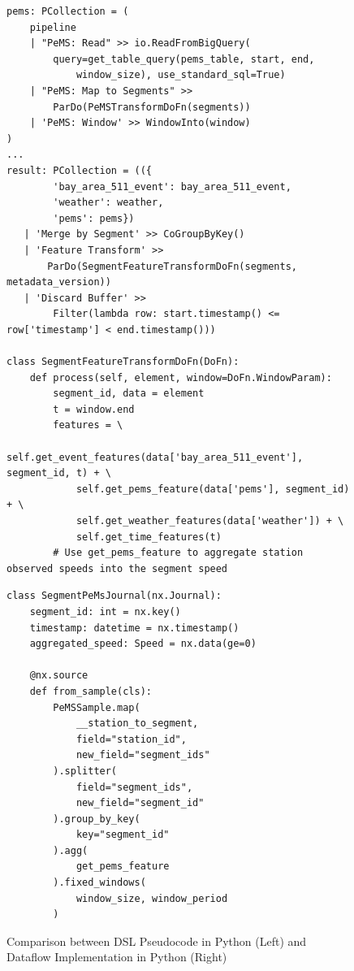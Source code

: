 \begin{figure}
    \centering
  \begin{minipage}[t]{.45\linewidth}
\begin{verbatim}
pems: PCollection = (
    pipeline
    | "PeMS: Read" >> io.ReadFromBigQuery(
        query=get_table_query(pems_table, start, end, 
            window_size), use_standard_sql=True)
    | "PeMS: Map to Segments" >> 
        ParDo(PeMSTransformDoFn(segments))
    | 'PeMS: Window' >> WindowInto(window)
)
...
result: PCollection = (({
        'bay_area_511_event': bay_area_511_event, 
        'weather': weather, 
        'pems': pems})
   | 'Merge by Segment' >> CoGroupByKey()
   | 'Feature Transform' >> 
       ParDo(SegmentFeatureTransformDoFn(segments, metadata_version))
   | 'Discard Buffer' >> 
        Filter(lambda row: start.timestamp() <= row['timestamp'] < end.timestamp()))

class SegmentFeatureTransformDoFn(DoFn):
    def process(self, element, window=DoFn.WindowParam):
        segment_id, data = element
        t = window.end
        features = \ 
            self.get_event_features(data['bay_area_511_event'], segment_id, t) + \
            self.get_pems_feature(data['pems'], segment_id) + \
            self.get_weather_features(data['weather']) + \
            self.get_time_features(t)
        # Use get_pems_feature to aggregate station observed speeds into the segment speed
\end{verbatim}
\end{minipage}
\begin{minipage}[t]{.45\linewidth}
\begin{verbatim}
class SegmentPeMsJournal(nx.Journal):
    segment_id: int = nx.key()
    timestamp: datetime = nx.timestamp()
    aggregated_speed: Speed = nx.data(ge=0)

    @nx.source
    def from_sample(cls):
        PeMSSample.map(
            __station_to_segment,
            field="station_id", 
            new_field="segment_ids"
        ).splitter(
            field="segment_ids", 
            new_field="segment_id"
        ).group_by_key(
            key="segment_id"
        ).agg(
            get_pems_feature
        ).fixed_windows(
            window_size, window_period
        )
\end{verbatim}
\end{minipage}  
    \caption{Comparison between DSL Pseudocode in Python (Left) and Dataflow Implementation in Python (Right)}
    \label{fig:comparison}
\end{figure}

